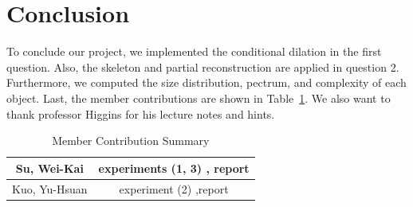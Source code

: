 \documentclass[paper=a4, fontsize=11pt]{scrartcl}
\begin{document}
\section{Conclusion}
To conclude our project, we implemented the conditional dilation in the first question. Also, the skeleton and partial reconstruction are applied in question 2. Furthermore, we computed the size distribution, pectrum, and complexity of each object.  Last, the member contributions are shown in Table~\ref{tab:contr}. We also want to thank professor Higgins for his lecture notes and hints.

\begin{table}
	\centering
	\caption{Member Contribution Summary}
	\begin{tabular}{c|c} \hline
       Su, Wei-Kai & experiments (1, 3) , report \\ \hline
	Kuo, Yu-Hsuan & experiment (2) ,report \\ \hline
	
	\end{tabular}
	\label{tab:contr}
\end{table}
\end{document}
